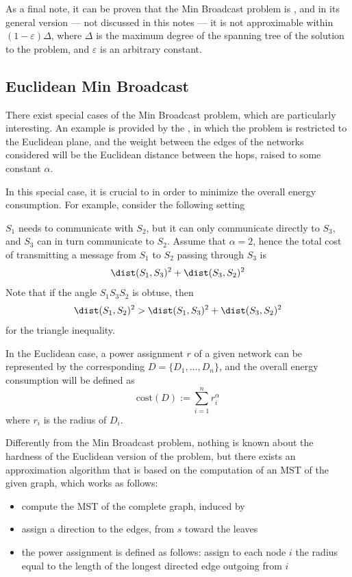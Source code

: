 \documentclass[a4paper, 12pt]{report}
\begin{document}
    As a final note, it can be proven that the Min Broadcast problem is \NPComplete \cite{cagalj}, and in its general version --- not discussed in this notes --- it is not approximable within $(1 - \varepsilon) \Delta$, where $\Delta$ is the maximum degree of the spanning tree of the solution to the problem, and $\varepsilon$ is an arbitrary constant.

    \subsection{Euclidean Min Broadcast}

    There exist special cases of the Min Broadcast problem, which are particularly interesting. An example is provided by the , in which the problem is restricted to the Euclidean plane, and the weight between the edges of the networks considered will be the Euclidean distance between the hops, raised to some constant $\alpha$.

    In this special case, it is crucial to  in order to minimize the overall energy consumption. For example, consider the following setting


    $S_1$ needs to communicate with $S_2$, but it can only communicate directly to $S_3$, and $S_3$ can in turn communicate to $S_2$. Assume that $\alpha = 2$, hence the total cost of transmitting a message from $S_1$ to $S_2$ passing through $S_3$ is $$\dist(S_1, S_3)^2 + \dist(S_3, S_2)^2$$ Note that if the angle $S_1S_3S_2$ is obtuse, then $$\dist(S_1, S_2)^2 > \dist(S_1, S_3)^2 + \dist(S_3, S_2)^2$$ for the triangle inequality.

    In the Euclidean case, a power assignment $r$ of a given network can be represented by the corresponding  $D = \{D_1, \ldots, D_n\}$, and the overall energy consumption will be defined as $$\mathrm{cost}(D) := \sum_{i = 1}^n{r_i^\alpha}$$ where $r_i$ is the radius of $D_i$.

    Differently from the Min Broadcast problem, nothing is known about the hardness of the Euclidean version of the problem, but there exists an approximation algorithm that is based on the computation of an MST of the given graph, which works as follows:

    \begin{itemize}
        \item compute the MST of the complete graph, induced by 
        \item assign a direction to the edges, from $s$ toward the leaves
        \item the power assignment is defined as follows: assign to each node $i$ the radius equal to the length of the longest directed edge outgoing from $i$
    \end{itemize}
\end{document}
